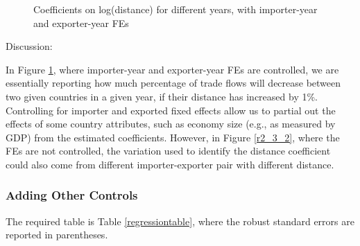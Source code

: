 \documentclass[12pt]{article}
\theoremstyle{definition}
\begin{document}
\begin{figure}[H]
    \noindent\caption{Coefficients on log(distance) for different years, with importer-year and exporter-year FEs}
    \begin{center}
        \label{r2_3_3}
    \end{center}
\end{figure}

Discussion:

In Figure \ref{r2_3_3}, where importer-year and exporter-year FEs are controlled, we are essentially reporting how much percentage of trade flows will decrease between two given countries in a given year, if their distance has increased by 1\%. Controlling for importer and exported fixed effects allow us to partial out the effects of some country attributes, such as economy size (e.g., as measured by GDP) from the estimated coefficients. However, in Figure \ref{r2_3_2}, where the FEs are not controlled, the variation used to identify the distance coefficient could also come from different importer-exporter pair with different distance. 

\newpage 
\subsubsection{Adding Other Controls}

The required table is Table \ref{regressiontable}, where the robust standard errors are reported in parentheses. 

\begin{table}[H]
	\centering
	\caption{}
    \resizebox{0.5\textwidth}{!}{
        \begin{threeparttable}
            
        \end{threeparttable}
    }
	\label{regressiontable}
\end{table}
\end{document}
